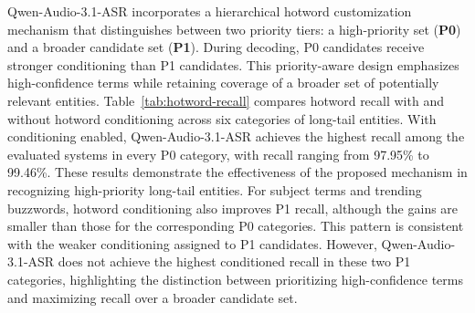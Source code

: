 \documentclass{article}
\begin{document}
Qwen-Audio-3.1-ASR incorporates a hierarchical hotword customization mechanism that distinguishes between two priority tiers: a high-priority set (\textbf{P0}) and a broader candidate set (\textbf{P1}). During decoding, P0 candidates receive stronger conditioning than P1 candidates. This priority-aware design emphasizes high-confidence terms while retaining coverage of a broader set of potentially relevant entities.
Table~\ref{tab:hotword-recall} compares hotword recall with and without hotword conditioning across six categories of long-tail entities.
With conditioning enabled, Qwen-Audio-3.1-ASR achieves the highest recall among the evaluated systems in every P0 category, with recall ranging from 97.95\% to 99.46\%. These results demonstrate the effectiveness of the proposed mechanism in recognizing high-priority long-tail entities.
For subject terms and trending buzzwords, hotword conditioning also improves P1 recall, although the gains are smaller than those for the corresponding P0 categories. This pattern is consistent with the weaker conditioning assigned to P1 candidates. However, Qwen-Audio-3.1-ASR does not achieve the highest conditioned recall in these two P1 categories, highlighting the distinction between prioritizing high-confidence terms and maximizing recall over a broader candidate set.
\end{document}
